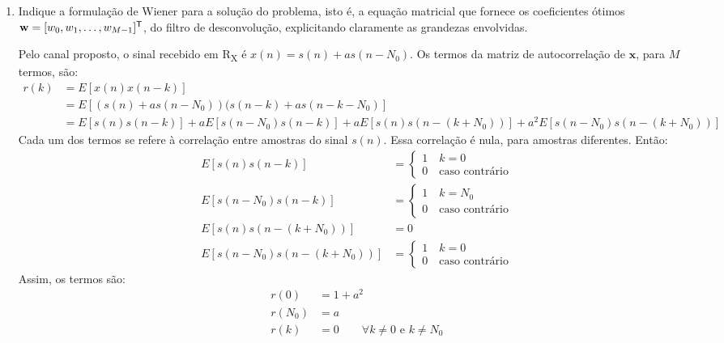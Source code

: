 \begin{enumerate}[label={\bf \roman*:},series=exerc,align=left]
    \item Indique a formulação de Wiener para a solução do problema, isto é, a equação matricial que fornece os coeficientes ótimos $\mathbf{w} = [w_0, w_1, \dots, w_{M-1}]^{\mathsf{T}}$, do filtro de desconvolução, explicitando claramente as grandezas envolvidas.

    Pelo canal proposto, o sinal recebido em R\textsubscript{X} é $x(n) = s(n) + as(n-N_0)$.
    Os termos da matriz de autocorrelação de $\mathbf{x}$, para $M$ termos, são:
    \begin{align*}
        r(k) &= E[x(n)x(n-k)] \\
        &= E[(s(n)+as(n-N_0))(s(n-k)+as(n-k-N_0)] \\
        &= E[s(n)s(n-k)] + aE[s(n-N_0)s(n-k)] + aE[s(n)s(n-(k+N_0))] + a^2E[s(n-N_0)s(n-(k+N_0))]
    \end{align*}
    Cada um dos termos se refere à correlação entre amostras do sinal $s(n)$.
    Essa correlação é nula, para amostras diferentes.
    Então:
    \begin{align*}
        E[s(n)s(n-k)] &= \begin{cases}
                            1 \quad k=0 \\
                            0 \quad \text{caso contrário}
                        \end{cases} \\
        E[s(n-N_0)s(n-k)] &= \begin{cases}
                                1 \quad k=N_0 \\
                                0 \quad \text{caso contrário}
                            \end{cases} \\
        E[s(n)s(n-(k+N_0))] &= 0 \\
        E[s(n-N_0)s(n-(k+N_0))] &= \begin{cases}
                                      1 \quad k=0 \\
                                      0 \quad \text{caso contrário}
                                  \end{cases}
    \end{align*}
    Assim, os termos são:
    \begin{align*}
        r(0) &= 1+a^2 \\
        r(N_0) &= a \\
        r(k) &= 0 \qquad \forall k \neq 0 \text{ e } k \neq N_0

\end{align*}
\end{enumerate}
